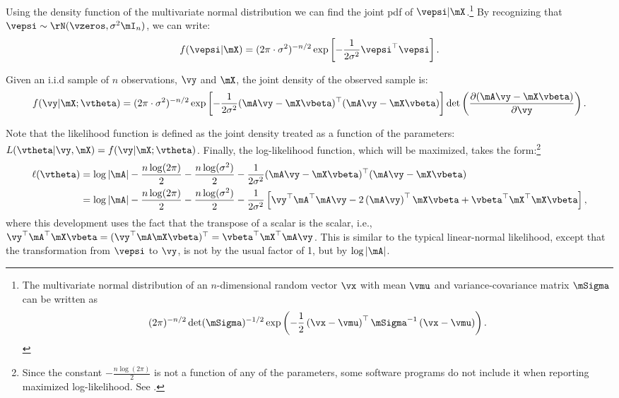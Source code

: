 Using the density function of the multivariate normal distribution we can find the joint pdf of $\vepsi|\mX$.\footnote{The multivariate normal distribution of an $n$-dimensional random vector $\vx$ with mean $\vmu$ and variance-covariance matrix $\mSigma$ can be written as 
\begin{equation*}
(2\pi)^{-n/2}\det(\mSigma)^{-1/2}\exp\left(-\frac{1}{2}\left(\vx - \vmu\right)^\top\mSigma^{-1}\left(\vx - \vmu\right)\right).
\end{equation*}
} By recognizing that $\vepsi \sim \rN(\vzeros, \sigma^2\mI_n)$, we can write: 
\begin{equation*}
	f(\vepsi | \mX) = (2\pi \cdot\sigma^2)^{-n/2}\exp\left[-\frac{1}{2\sigma^2}\vepsi^\top\vepsi\right].
\end{equation*}

Given an i.i.d sample of $n$ observations, $\vy$ and $\mX$, the joint density of the observed sample is:
\begin{equation*}
	f(\vy|\mX;\vtheta) = (2\pi \cdot\sigma^2)^{-n/2}\exp\left[-\frac{1}{2\sigma^2}(\mA\vy-\mX\vbeta)^\top (\mA\vy-\mX\vbeta)\right]\det\left(\frac{\partial (\mA\vy - \mX\vbeta)}{\partial \vy}\right).
	\end{equation*}
	
Note that the likelihood function is defined as the joint density treated as a function of the parameters: $L(\vtheta|\vy, \mX) = f(\vy|\mX;\vtheta)$. Finally, the log-likelihood function, which will be maximized, takes the form:\footnote{Since the constant $- \frac{n\log(2\pi)}{2}$ is not a function of any of the parameters, some software programs do not include it when reporting maximized log-likelihood. See \cite{spdep}.}
\begin{equation} \label{eq:LL_SLM_2}
  \begin{aligned}
\ell (\vtheta) &= \log\left| \mA\right| - \frac{n\log(2\pi)}{2} - \frac{n\log(\sigma^2)}{2} - \frac{1}{2\sigma^2}(\mA\vy-\mX\vbeta)^\top (\mA\vy-\mX\vbeta) \\
&= \log\left| \mA\right| - \frac{n\log(2\pi)}{2} - \frac{n\log(\sigma^2)}{2} - \frac{1}{2\sigma^2}\left[\vy^\top \mA^\top\mA\vy - 2\left(\mA\vy\right)^\top\mX\vbeta + \vbeta^\top\mX^\top\mX\vbeta\right],
\end{aligned}
\end{equation}	
%	
where this development uses the fact that the transpose of a scalar is the scalar, i.e., 	$\vy^\top\mA^\top\mX\vbeta = (\vy^\top\mA\mX\vbeta)^\top = \vbeta^\top\mX^\top\mA\vy$. This is similar to the typical linear-normal likelihood, except that the transformation from $\vepsi$ to $\vy$, is not by the usual factor of 1, but by $\log\left| \mA\right|$.

